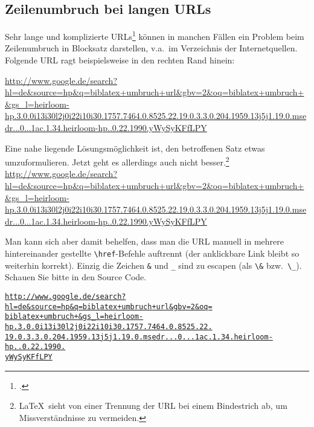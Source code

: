 \subsection{Zeilenumbruch bei langen URLs}
Sehr lange und komplizierte URLs\footcite{langeURL} können in manchen Fällen ein Problem beim Zeilenumbruch in Blocksatz darstellen, v.a.\ im Verzeichnis der Internetquellen. Folgende URL ragt beispielsweise in den rechten Rand hinein: 

\url{http://www.google.de/search?hl=de&source=hp&q=biblatex+umbruch+url&gbv=2&oq=biblatex+umbruch+&gs_l=heirloom-hp.3.0.0i13i30l2j0i22i10i30.1757.7464.0.8525.22.19.0.3.3.0.204.1959.13j5j1.19.0.msedr...0...1ac.1.34.heirloom-hp..0.22.1990.yWySyKFfLPY}

Eine nahe liegende Lösungsmöglichkeit ist, den betroffenen Satz etwas umzuformulieren.
Jetzt geht es allerdings auch nicht besser.\footnote{%
\LaTeX\ sieht von einer Trennung der URL bei einem Bindestrich ab, um Missverständnisse zu vermeiden.
}
\url{http://www.google.de/search?hl=de&source=hp&q=biblatex+umbruch+url&gbv=2&oq=biblatex+umbruch+&gs_l=heirloom-hp.3.0.0i13i30l2j0i22i10i30.1757.7464.0.8525.22.19.0.3.3.0.204.1959.13j5j1.19.0.msedr...0...1ac.1.34.heirloom-hp..0.22.1990.yWySyKFfLPY}

Man kann sich aber damit behelfen, dass man die URL manuell in mehrere hintereinander gestellte \verb|\href|-Befehle auftrennt (der anklickbare Link bleibt so weiterhin korrekt). Einzig die Zeichen \verb|&| und \verb|_| sind zu escapen (als \verb|\&| bzw.\ \verb|\_|). Schauen Sie bitte in den Source Code.

\newcommand{\mylongurl}[1]{%
\href{http://www.google.de/search?hl=de&source=hp&q=biblatex+umbruch+url&gbv=2&oq=biblatex+umbruch+&gs_l=heirloom-hp.3.0.0i13i30l2j0i22i10i30.1757.7464.0.8525.22.19.0.3.3.0.204.1959.13j5j1.19.0.msedr...0...1ac.1.34.heirloom-hp..0.22.1990.yWySyKFfLPY}{\texttt{#1}}\\}

\mylongurl{http://www.google.de/search?hl=de\&source=hp\&q=biblatex+umbruch+url\&gbv=2\&oq=}
\mylongurl{biblatex+umbruch+\&gs\_l=heirloom-hp.3.0.0i13i30l2j0i22i10i30.1757.7464.0.8525.22.}
\mylongurl{19.0.3.3.0.204.1959.13j5j1.19.0.msedr...0...1ac.1.34.heirloom-hp..0.22.1990.}
\mylongurl{yWySyKFfLPY}

